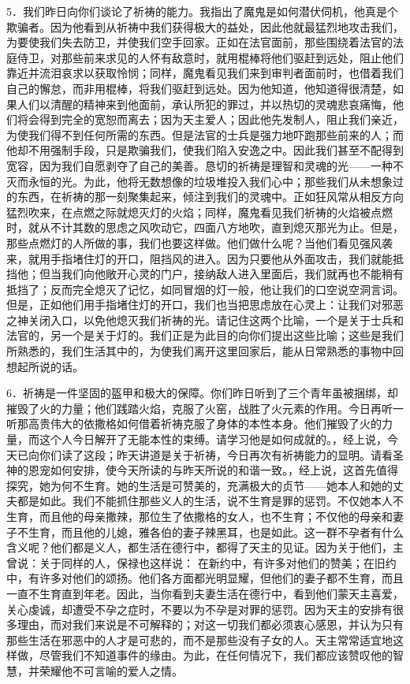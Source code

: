 5．我们昨日向你们谈论了祈祷的能力。我指出了魔鬼是如何潜伏伺机，他真是个欺骗者。因为他看到从祈祷中我们获得极大的益处，因此他就最猛烈地攻击我们，为要使我们失去防卫，并使我们空手回家。正如在法官面前，那些围绕着法官的法庭侍卫，对那些前来求见的人怀有敌意时，就用棍棒将他们驱赶到远处，阻止他们靠近并流泪哀求以获取怜悯；同样，魔鬼看见我们来到审判者面前时，也借着我们自己的懈怠，而非用棍棒，将我们驱赶到远处。因为他知道，他知道得很清楚，如果人们以清醒的精神来到他面前，承认所犯的罪过，并以热切的灵魂悲哀痛悔，他们将会得到完全的宽恕而离去；因为天主爱人；因此他先发制人，阻止我们亲近，为使我们得不到任何所需的东西。但是法官的士兵是强力地吓跑那些前来的人；而他却不用强制手段，只是欺骗我们，使我们陷入安逸之中。因此我们甚至不配得到宽容，因为我们自愿剥夺了自己的美善。恳切的祈祷是理智和灵魂的光——一种不灭而永恒的光。为此，他将无数想像的垃圾堆投入我们心中；那些我们从未想象过的东西，在祈祷的那一刻聚集起来，倾注到我们的灵魂中。正如狂风常从相反方向猛烈吹来，在点燃之际就熄灭灯的火焰；同样，魔鬼看见我们祈祷的火焰被点燃时，就从不计其数的思虑之风吹动它，四面八方地吹，直到熄灭那光为止。但是，那些点燃灯的人所做的事，我们也要这样做。他们做什么呢？当他们看见强风袭来，就用手指堵住灯的开口，阻挡风的进入。因为只要他从外面攻击，我们就能抵挡他；但当我们向他敞开心灵的门户，接纳敌人进入里面后，我们就再也不能稍有抵挡了；反而完全熄灭了记忆，如同冒烟的灯一般，他让我们的口空说空洞言词。但是，正如他们用手指堵住灯的开口，我们也当把思虑放在心灵上：让我们对邪恶之神关闭入口，以免他熄灭我们祈祷的光。请记住这两个比喻，一个是关于士兵和法官的，另一个是关于灯的。我们正是为此目的向你们提出这些比喻；这些是我们所熟悉的，我们生活其中的，为使我们离开这里回家后，能从日常熟悉的事物中回想起所说的话。\par

6．祈祷是一件坚固的盔甲和极大的保障。你们昨日听到了三个青年虽被捆绑，却摧毁了火的力量；他们践踏火焰，克服了火窑，战胜了火元素的作用。今日再听一听那高贵伟大的依撒格如何借着祈祷克服了身体的本性本身。他们摧毁了火的力量，而这个人今日解开了无能本性的束缚。请学习他是如何成就的。，经上说，今天已向你们读了这段；昨天讲道是关于祈祷，今日再次有祈祷能力的显明。请看圣神的恩宠如何安排，使今天所读的与昨天所说的和谐一致。，经上说，这首先值得探究，她为何不生育。她的生活是可赞美的，充满极大的贞节——她本人和她的丈夫都是如此。我们不能抓住那些义人的生活，说不生育是罪的惩罚。不仅她本人不生育，而且他的母亲撒辣，那位生了依撒格的女人，也不生育；不仅他的母亲和妻子不生育，而且他的儿媳，雅各伯的妻子辣黑耳，也是如此。这一群不孕者有什么含义呢？他们都是义人，都生活在德行中，都得了天主的见证。因为关于他们，主曾说：关于同样的人，保禄也这样说： 在新约中，有许多对他们的赞美；在旧约中，有许多对他们的颂扬。他们各方面都光明显耀，但他们的妻子都不生育，而且一直不生育直到年老。因此，当你看到夫妻生活在德行中，看到他们蒙天主喜爱，关心虔诚，却遭受不孕之症时，不要以为不孕是对罪的惩罚。因为天主的安排有很多理由，而对我们来说是不可解释的；对这一切我们都必须衷心感恩，并认为只有那些生活在邪恶中的人才是可悲的，而不是那些没有子女的人。天主常常适宜地这样做，尽管我们不知道事件的缘由。为此，在任何情况下，我们都应该赞叹他的智慧，并荣耀他不可言喻的爱人之情。\par

